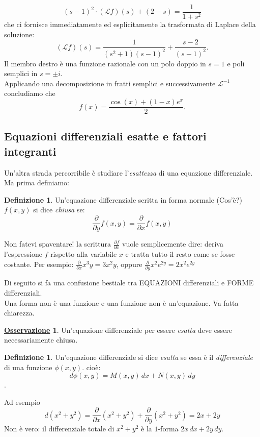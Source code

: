 \documentclass[a4paper,twoside]{article}
\theoremstyle{definition}
\newtheorem{definizione}[theorem]{Definizione}
\newtheorem{oss}{\underline{\textrm Osservazione}}
\numberwithin{theorem}{section}
\begin{document}
$$ (s-1)^2\cdot(\mathcal{L}f)(s)+(2-s) = \frac{1}{1+s^2} $$
che ci fornisce immediatamente ed esplicitamente la trasformata di Laplace della soluzione:
$$ (\mathcal{L}f)(s) = \frac{1}{(s^2+1)(s-1)^2}+\frac{s-2}{(s-1)^2}. $$
Il membro destro è una funzione razionale con un polo doppio in $s=1$ e poli semplici in $s=\pm i$.\\ Applicando una decomposizione in fratti semplici e successivamente $\mathcal{L}^{-1}$ concludiamo che 
$$ f(x) = \frac{\cos(x)+(1-x)e^x}{2}. $$

\subsection{Equazioni differenziali esatte e fattori integranti}
Un'altra strada percorribile è studiare l'\emph{esattezza} di una equazione differenziale. Ma prima definiamo:
\begin{definizione}
    Un'equazione differenziale scritta in forma normale ({\color{red}Cos'è?}) $f(x,y)$ si dice \emph{chiusa} se: $$\frac{\partial }{\partial y}f(x,y)=\frac{\partial }{\partial x}f(x,y)$$ 
\end{definizione}
Non fatevi spaventare! la scrittura $\frac{\partial f}{\partial x}$ vuole semplicemente dire: deriva l'espressione $f$ rispetto alla variabile $x$ e tratta tutto il resto come se fosse costante. Per esempio: 
$\frac{\partial}{\partial x} x^3y= 3x^2y$, oppure $\frac{\partial}{\partial y}x^2e^{2y}=2x^2e^{2y}$

{\color{red} Di seguito si fa una confusione bestiale tra EQUAZIONI differenziali e FORME differenziali.\\ Una forma non è una funzione e una funzione non è un'equazione. Va fatta chiarezza.}

\begin{oss}
    Un'equazione differenziale per essere \emph{esatta} deve essere necessariamente chiusa.
\end{oss}
\begin{definizione}
   Un'equazione differenziale si dice \emph{esatta} se essa è il \emph{differenziale} di una funzione $\phi(x,y)$. cioè: $$d\phi(x,y)=M(x,y)\,dx + N(x,y)\, dy$$. 
\end{definizione}
 Ad esempio $$d(x^2+y^2)=\frac{\partial}{\partial x}(x^2+y^2)+\frac{\partial}{\partial y}(x^2+y^2)= 2x + 2y$$
{\color{red}Non è vero: il differenziale totale di $x^2+y^2$ è la $1$-forma $2x\,dx+2y\,dy$.} 
\end{document}

